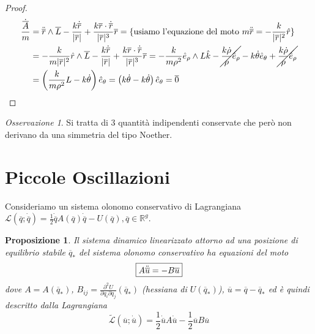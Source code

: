 \documentclass{book}
\theoremstyle{plain}
\theoremstyle{plain}
\theoremstyle{plain}
\theoremstyle{plain}
\theoremstyle{plain}
\newtheorem{prop}{Proposizione}[chapter]
\theoremstyle{definition}
\theoremstyle{remark}
\newtheorem*{oss}{Osservazione}
\theoremstyle{definition}
\begin{document}
\begin{proof}
    \[
    \begin{split}
        \frac{\Dot{\overline{A}}}{m}&=\Ddot{\overline{r}}\wedge\overline{L}-\frac{k\Dot{\overline{r}}}{|\overline{r}|}+\frac{k\overline{r}\cdot\Dot{\overline{r}}}{|\overline{r}|^3}\overline{r}=\{\text{usiamo l'equazione del moto $m\Ddot{\overline{r}}=-\frac{k}{|\overline{r}|^2}\hat{r}$}\} \\
        &=-\frac{k}{m|\overline{r}|^2}\hat{r}\wedge\overline{L}-\frac{k\Dot{\overline{r}}}{|\overline{r}|}+\frac{k\overline{r}\cdot\Dot{\overline{r}}}{|\overline{r}|^3}\overline{r}=-\frac{k}{m\rho^2}\hat{e}_{\rho}\wedge L\hat{k}-\cancel{\frac{k\Dot{\rho}}{\rho}\hat{e}_{\rho}}-k\Dot{\theta}\hat{e}_{\theta}+\cancel{\frac{k\Dot{\rho}}{\rho}\hat{e}_{\rho}} \\
        &=\left(\frac{k}{m\rho^2}L-k\Dot{\theta}\right)\hat{e}_{\theta}=\left(k\Dot{\theta}-k\Dot{\theta}\right)\hat{e}_{\theta}=\overline{0}
    \end{split}
    \]
\end{proof}

\begin{oss}
    Si tratta di $3$ quantità indipendenti conservate che però non derivano da una simmetria del tipo Noether.
\end{oss}

\section{Piccole Oscillazioni}

Consideriamo un sistema olonomo conservativo di Lagrangiana $\mathcal{L}(\overline{q};\dot{\overline{q}})=\frac{1}{2}\dot{\overline{q}}A(\overline{q})\Dot{\overline{q}} -U(\overline{q}), \overline{q}\in\mathbb{R}^g$.

\begin{prop}
    Il sistema dinamico linearizzato attorno  ad una posizione di equilibrio stabile $\overline{q}_*$ del sistema olonomo conservativo ha equazioni del moto
    \begin{displaymath}
    \boxed{
        A\Ddot{\overline{u}}= -B\overline{u}
        }
    \end{displaymath}
    dove $A=A(\overline{q}_*)$, $B_{ij}= \frac{\partial^2U}{\partial q_i\partial q_j}(\overline{q}_*)$ (hessiana di $U(\overline{q}_*)$), $\overline{u}=\overline{q}-\overline{q}_*$
    ed è quindi descritto dalla Lagrangiana
    \begin{displaymath}
    \boxed{
        \widetilde{\mathcal{L}}(\overline{u};\dot{\overline{u}})=\frac{1}{2}\Dot{\overline{u}}A\Dot{\overline{u}} -\frac{1}{2}\overline{u}B\overline{u}
        }
    \end{displaymath}
\end{prop}
\end{document}
